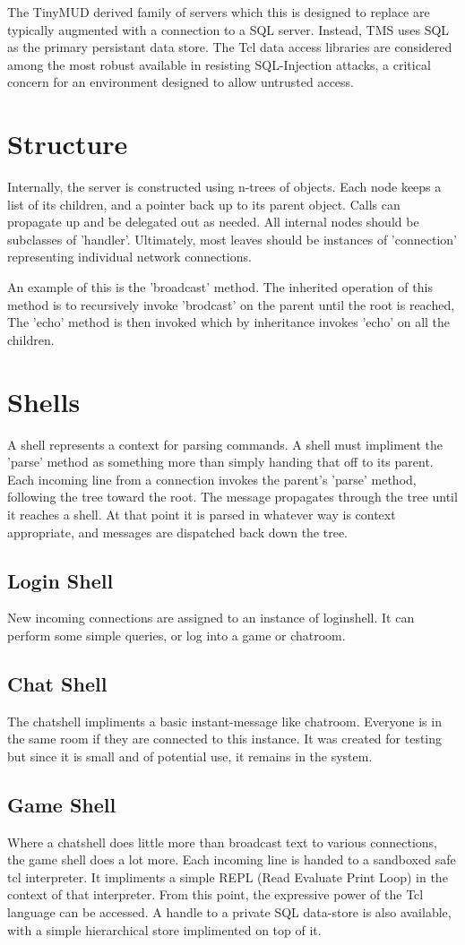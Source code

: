 \documentclass[10pt,letterpaper,twoside]{book}
\begin{document}
The TinyMUD derived family of servers which this is designed to replace are typically augmented with a connection to a SQL server.
Instead, TMS uses SQL as the primary persistant data store.
The Tcl data access libraries are considered among the most robust available in resisting SQL-Injection attacks,
a critical concern for an environment designed to allow untrusted access.
\chapter{Structure}
Internally, the server is constructed using n-trees of objects.
Each node keeps a list of its children, and a pointer back up to its parent object.
Calls can propagate up and be delegated out as needed.
All internal nodes should be subclasses of 'handler'.
Ultimately, most leaves should be instances of 'connection' representing individual network connections.

An example of this is the 'broadcast' method.
The inherited operation of this method is to recursively invoke 'brodcast' on the parent until the root is reached,
The 'echo' method is then invoked which by inheritance invokes 'echo' on all the children.
\chapter{Shells}
A shell represents a context for parsing commands.
A shell must impliment the 'parse' method as something more than simply handing that off to its parent.
Each incoming line from a connection invokes the parent's 'parse' method, following the tree toward the root.
The message propagates through the tree until it reaches a shell.
At that point it is parsed in whatever way is context appropriate, and messages are dispatched back down the tree.
\section{Login Shell}
New incoming connections are assigned to an instance of loginshell.
It can perform some simple queries, or log into a game or chatroom.
\section{Chat Shell}
The chatshell impliments a basic instant-message like chatroom.
Everyone is in the same room if they are connected to this instance.
It was created for testing but since it is small and of potential use, it remains in the system.
\section{Game Shell}
Where a chatshell does little more than broadcast text to various connections, the game shell does a lot more.
Each incoming line is handed to a sandboxed safe tcl interpreter.
It impliments a simple REPL (Read Evaluate Print Loop) in the context of that interpreter.
From this point, the expressive power of the Tcl language can be accessed.
A handle to a private SQL data-store is also available, with a simple hierarchical store implimented on top of it.
\backmatter
\end{document}
